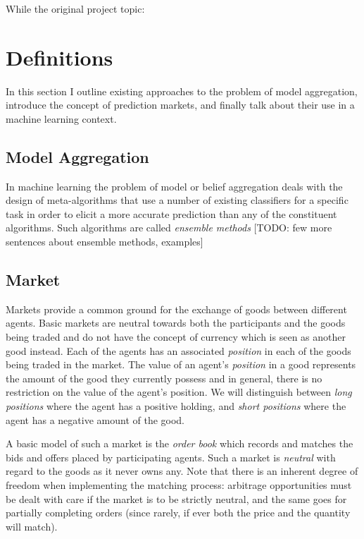 \documentclass[bsc,frontabs,twoside,singlespacing,parskip,deptreport]{infthesis}     %
\begin{document}
	While the original project topic: 
   
   
   
\chapter{Definitions}

    In this section I outline existing approaches to the problem of model aggregation, introduce the concept of prediction markets, and finally talk about their use in a machine learning context. 


\section{Model Aggregation}
    In machine learning the problem of model or belief aggregation deals with the design of meta-algorithms that use a number of existing classifiers for a specific task in order to elicit a more accurate prediction than any of the constituent algorithms. Such algorithms are called {\em ensemble methods} [TODO: few more sentences about ensemble methods, examples]

\section{Market}

    Markets provide a common ground for the exchange of goods between different agents. Basic markets are neutral towards both the participants and the goods being traded and do not have the concept of currency which is seen as another good instead. Each of the agents has an associated {\em position} in each of the goods being traded in the market. The value of an agent's {\em position} in a good represents the amount of the good they currently possess and in general, there is no restriction on the value of the agent's position. We will distinguish between {\em long positions} where the agent has a positive holding, and {\em short positions} where the agent has a negative amount of the good.

    A basic model of such a market is the {\em order book} which records and matches the bids and offers placed by participating agents. Such a market is {\em neutral} with regard to the goods as it never owns any. Note that there is an inherent degree of freedom when implementing the matching process: arbitrage opportunities must be dealt with care if the market is to be strictly neutral, and the same goes for partially completing orders (since rarely, if ever both the price and the quantity will match).
\end{document}
